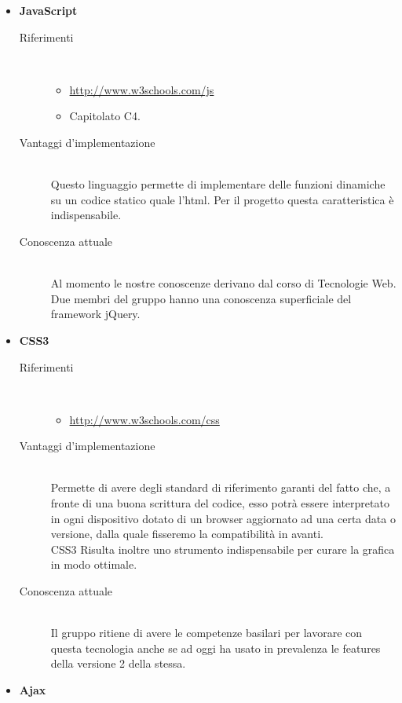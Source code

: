 \begin{itemize}
\begin{description}
	\end{description}
	\item \textbf{JavaScript}
	\begin{description}
		\item[Riferimenti] \hfill \\ 
		\begin{itemize}
			\item \url{http://www.w3schools.com/js}
			\item Capitolato C4.
		\end{itemize}
		\item[Vantaggi d'implementazione] \hfill \\ Questo linguaggio permette di implementare delle funzioni dinamiche su un codice statico quale l’html. Per il progetto \PROGETTO{} questa caratteristica è indispensabile.
		\item[Conoscenza attuale] \hfill \\ Al momento le nostre conoscenze derivano dal corso di Tecnologie Web. \\ Due membri del gruppo hanno una conoscenza superficiale del framework jQuery.
	\end{description}
	\item \textbf{CSS3}
	\begin{description}
		\item[Riferimenti] \hfill \\
		\begin{itemize}
			\item \url{http://www.w3schools.com/css}
		\end{itemize}
		\item[Vantaggi d'implementazione] \hfill \\ Permette di avere degli standard di riferimento garanti del fatto che, a fronte di una buona scrittura del codice, esso potrà essere interpretato in ogni dispositivo dotato di un browser aggiornato ad una certa data o versione, dalla quale fisseremo la compatibilità in avanti. \\ CSS3 Risulta inoltre uno strumento indispensabile per curare la grafica in modo ottimale.
		\item[Conoscenza attuale] \hfill \\ Il gruppo ritiene di avere le competenze basilari per lavorare con questa tecnologia anche se ad oggi ha usato in prevalenza le features della versione 2 della stessa.
	\end{description}
	\item \textbf{Ajax}
	\begin{description}

\end{description}
\end{itemize}
